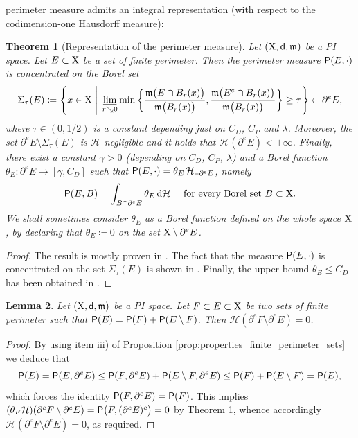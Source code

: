 \documentclass[reqno]{amsart}
\numberwithin{equation}{section}
\newcommand{\X}{{\rm X}}
\newcommand{\sfd}{{\sf d}}
\newcommand{\mm}{\mathfrak m}
\renewcommand{\d}{{\mathrm d}}
\newcommand{\1}{\mathbbm 1}
\newcommand{\limi}{\varliminf}
\renewcommand{\P}{{\sf P}}
\renewcommand{\H}{{\mathcal H}}
\newtheorem{theorem}{Theorem}[section]
\newtheorem{lemma}[theorem]{Lemma}
\begin{document}
perimeter measure admits an integral representation (with respect
to the codimension-one Hausdorff measure):
%
%
\begin{theorem}[Representation of the perimeter measure]\label{thm:repr_per}
Let \((\X,\sfd,\mm)\) be a PI space. Let \(E\subset\X\) be a set of finite
perimeter. Then the perimeter measure \(\P(E,\cdot)\) is concentrated on the Borel set
\begin{equation}\label{eq:def_Sigma_tau}
\Sigma_\tau(E)\coloneqq
\Bigg\{x\in\X\;\Bigg|\;\limi_{r\searrow 0}
\min\bigg\{\frac{\mm\big(E\cap B_r(x)\big)}{\mm\big(B_r(x)\big)},
\frac{\mm\big(E^c\cap B_r(x)\big)}{\mm\big(B_r(x)\big)}\bigg\}\geq\tau\Bigg\}
\subset\partial^e E,
\end{equation}
where \(\tau\in(0,1/2)\) is a constant depending just on \(C_D\), \(C_P\) and \(\lambda\).
Moreover, the set \(\partial^e E\setminus\Sigma_\tau(E)\) is \(\H\)-negligible
and it holds that \(\H(\partial^e E)<+\infty\). Finally, there exist a constant
\(\gamma>0\) (depending on \(C_D\), \(C_P\), \(\lambda\)) and a Borel
function \(\theta_E\colon\partial^e E\to[\gamma,C_D]\) such that
\(\P(E,\cdot)=\theta_E\,\H\llcorner_{\partial^e E}\), namely
\begin{equation}\label{eq:representation_perimeter}
\P(E,B)=\int_{B\cap\partial^e E}\theta_E\,\d\H
\quad\text{ for every Borel set }B\subset\X.
\end{equation}
We shall sometimes consider \(\theta_E\) as a Borel function defined on the
whole space \(\X\), by declaring that \(\theta_E\coloneqq 0\) on
the set \(\X\setminus\partial^e E\).
\end{theorem}
\begin{proof}
The result is mostly proven in \cite[Theorem 5.3]{Ambrosio02}.
The fact that the measure \(\P(E,\cdot)\) is concentrated on the
set \(\Sigma_\tau(E)\) is shown in \cite[Theorem 5.4]{Ambrosio02}.
Finally, the upper bound \(\theta_E\leq C_D\) has been obtained in
\cite[Theorem 4.6]{AMP04}.
\end{proof}
%
%
\begin{lemma}\label{lem:incl_front_comp}
Let \((\X,\sfd,\mm)\) be a PI space. Let \(F\subset E\subset\X\) be two
sets of finite perimeter such that \(\P(E)=\P(F)+\P(E\setminus F)\).
Then \(\H(\partial^e F\setminus\partial^e E)=0\).
\end{lemma}
\begin{proof}
By using item iii) of Proposition \ref{prop:properties_finite_perimeter_sets}
we deduce that
\[
\P(E)=\P(E,\partial^e E)\leq\P(F,\partial^e E)+\P(E\setminus F,\partial^e E)
\leq\P(F)+\P(E\setminus F)=\P(E),
\]
which forces the identity \(\P(F,\partial^e E)=\P(F)\). This implies
\((\theta_F\H)(\partial^e F\setminus\partial^e E)=\P\big(F,(\partial^e E)^c\big)=0\)
by Theorem \ref{thm:repr_per}, whence accordingly
\(\H(\partial^e F\setminus\partial^e E)=0\), as required.
\end{proof}
\end{document}
